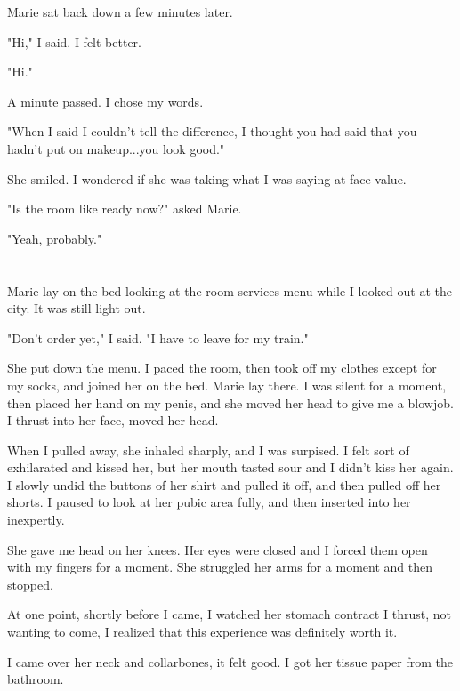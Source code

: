 \documentclass[12pt]{memoir}
\begin{document}
Marie sat back down a few minutes later.

"Hi," I said.  I felt better.

"Hi."

A minute passed.  I chose my words.

"When I said I couldn't tell the difference, I thought you had said that you
hadn't put on makeup...you look good."

She smiled.  I wondered if she was taking what I was saying at face value.

"Is the room like ready now?" asked Marie.

"Yeah, probably."

\section{}

Marie lay on the bed looking at the room services menu while I looked out at the
city.  It was still light out.  

"Don't order yet," I said.  "I have to leave for my train."

She put down the menu.  I paced the room, then took off my clothes except for my
socks, and joined her on the bed.  Marie lay there.  I was silent for a moment,
then placed her hand on my penis, and she moved her head to give me a blowjob.
I thrust into her face, moved her head.

When I pulled away, she inhaled sharply, and I was surpised.  I felt sort of
exhilarated and kissed her, but her mouth tasted sour and I didn't kiss her
again.  I slowly undid the buttons of her shirt and pulled it off, and then
pulled off her shorts.  I paused to look at her pubic area fully, and then
inserted into her inexpertly.  

She gave me head on her knees.  Her eyes were closed and I forced them open with
my fingers for a moment.  She struggled her arms for a moment and then stopped.  

At one point, shortly before I came, I watched her stomach contract I thrust,
not wanting to come, I realized that this experience was definitely worth it.

I came over her neck and collarbones, it felt good.  I got her tissue paper from
the bathroom.

\section{}
\end{document}

